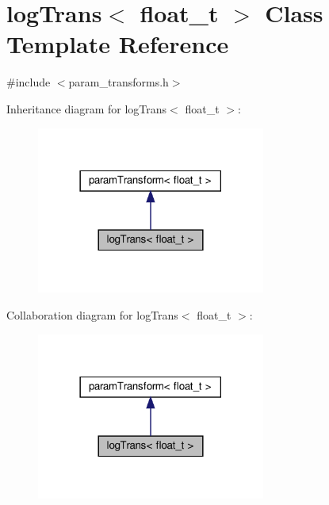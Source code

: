 \hypertarget{classlogTrans}{}\section{log\+Trans$<$ float\+\_\+t $>$ Class Template Reference}
\label{classlogTrans}


{\ttfamily \#include $<$param\+\_\+transforms.\+h$>$}



Inheritance diagram for log\+Trans$<$ float\+\_\+t $>$\+:\nopagebreak
\begin{figure}[H]
\begin{center}
\leavevmode
\includegraphics[width=213pt]{classlogTrans__inherit__graph}
\end{center}
\end{figure}


Collaboration diagram for log\+Trans$<$ float\+\_\+t $>$\+:\nopagebreak
\begin{figure}[H]
\begin{center}
\leavevmode
\includegraphics[width=213pt]{classlogTrans__coll__graph}
\end{center}
\end{figure}
